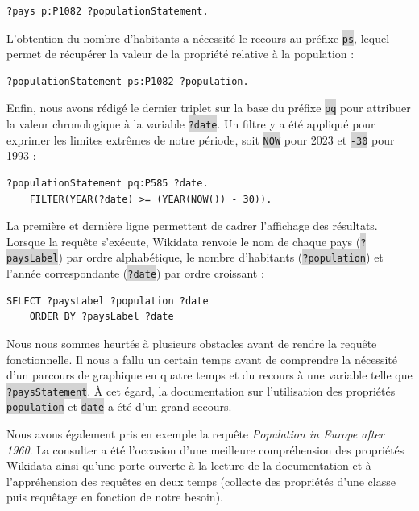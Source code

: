 \documentclass[hidelinks, 12pt]{article}
\newcommand{\code}[1]{\colorbox{LightGray}{\texttt{#1}}}
\begin{document}
\begin{lstlisting}[language=SPARQL]
	?pays p:P1082 ?populationStatement.
\end{lstlisting}

L'obtention du nombre d'habitants a nécessité le recours au préfixe \code{ps}, lequel permet de récupérer la valeur de la propriété relative à la population :

\begin{lstlisting}[language=SPARQL]
	?populationStatement ps:P1082 ?population.
\end{lstlisting}

Enfin, nous avons rédigé le dernier triplet sur la base du préfixe \code{pq} pour attribuer la valeur chronologique à la variable \code{?date}. Un filtre y a été appliqué pour exprimer les limites extrêmes de notre période, soit \code{NOW} pour 2023 et \code{-30} pour 1993 :

\begin{lstlisting}[language=SPARQL]
	?populationStatement pq:P585 ?date.
	FILTER(YEAR(?date) >= (YEAR(NOW()) - 30)).
\end{lstlisting}

La première et dernière ligne permettent de cadrer l'affichage des résultats. Lorsque la requête s'exécute, Wikidata renvoie le nom de chaque pays (\code{?paysLabel}) par ordre alphabétique, le nombre d'habitants (\code{?population}) et l'année correspondante (\code{?date}) par ordre croissant :

\begin{lstlisting}[language=SPARQL]
	SELECT ?paysLabel ?population ?date
	ORDER BY ?paysLabel ?date
\end{lstlisting}

Nous nous sommes heurtés à plusieurs obstacles avant de rendre la requête fonctionnelle. Il nous a fallu un certain temps avant de comprendre la nécessité d'un parcours de graphique en quatre temps et du recours à une variable telle que \code{?paysStatement}. À cet égard, la documentation sur l'utilisation des propriétés \code{population}\autocite{wikipop} et \code{date}\autocite{wikidate} a été d'un grand secours. 

Nous avons également pris en exemple la requête \emph{Population in Europe after 1960}\autocite{wiki1960}. La consulter a été l'occasion d'une meilleure compréhension des propriétés Wikidata ainsi qu'une porte ouverte à la lecture de la documentation et à l'appréhension des requêtes en deux temps (collecte des propriétés d'une classe puis requêtage en fonction de notre besoin).
\end{document}

